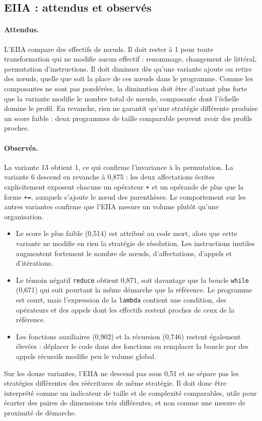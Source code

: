 \documentclass[12pt,a4paper,oneside]{report}
\begin{document}
\subsection{EIIA : attendus et observés}

\paragraph{Attendus.}
L'EIIA compare des effectifs de nœuds. Il doit rester à 1 pour toute
transformation qui ne modifie aucun effectif : renommage, changement de
littéral, permutation d'instructions. Il doit diminuer dès qu'une variante
ajoute ou retire des nœuds, quelle que soit la place de ces nœuds dans le
programme. Comme les composantes ne sont pas pondérées, la diminution doit
être d'autant plus forte que la variante modifie le nombre total de nœuds,
composante dont l'échelle domine le profil. En revanche, rien ne garantit
qu'une stratégie différente produise un score faible : deux programmes de
taille comparable peuvent avoir des profils proches.

\paragraph{Observés.}
La variante 13 obtient 1, ce qui confirme l'invariance à la permutation. La
variante 6 descend en revanche à 0,875 : les deux affectations écrites
explicitement exposent chacune un opérateur \texttt{+} et un opérande de plus
que la forme \texttt{+=}, auxquels s'ajoute le nœud des parenthèses. Le
comportement sur les autres variantes confirme que l'EIIA mesure un volume
plutôt qu'une organisation.
\begin{itemize}
  \item Le score le plus faible (0,514) est attribué au code mort, alors que
        cette variante ne modifie en rien la stratégie de résolution. Les
        instructions inutiles augmentent fortement le nombre de nœuds,
        d'affectations, d'appels et d'itérations.
  \item Le témoin négatif \texttt{reduce} obtient 0,871, soit davantage que la
        boucle \texttt{while} (0,671) qui suit pourtant la même démarche que
        la référence. Le programme est court, mais l'expression de la
        \texttt{lambda} contient une condition, des opérateurs et des appels
        dont les effectifs restent proches de ceux de la référence.
  \item Les fonctions auxiliaires (0,902) et la récursion (0,746) restent
        également élevées : déplacer le code dans des fonctions ou remplacer
        la boucle par des appels récursifs modifie peu le volume global.
\end{itemize}
Sur les douze variantes, l'EIIA ne descend pas sous 0,51 et ne sépare pas les
stratégies différentes des réécritures de même stratégie. Il doit donc être
interprété comme un indicateur de taille et de complexité comparables, utile
pour écarter des paires de dimensions très différentes, et non comme une
mesure de proximité de démarche.
\end{document}
